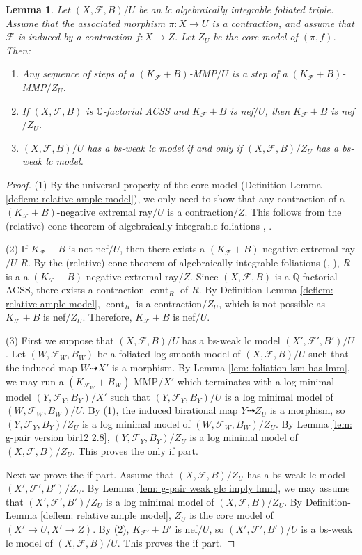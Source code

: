 \documentclass[11pt]{amsart}
\numberwithin{equation}{section}
\newcommand{\Qq}{\mathbb{Q}}
\newcommand{\cont}{\operatorname{cont}}
\newcommand{\Ff}{\mathcal{F}}
\newtheorem{lem}[thm]{Lemma}
\theoremstyle{definition}
\theoremstyle{definition}
\theoremstyle{definition}
\begin{document}
\begin{lem}\label{lem: minimal model foliation over zu}
    Let $(X,\Ff,B)/U$ be an lc algebraically integrable foliated triple. Assume that the associated morphism $\pi: X\rightarrow U$ is a contraction, and assume that $\Ff$ is induced by a contraction $f: X\rightarrow Z$. Let $Z_U$ be the core model of $(\pi,f)$. Then:
    \begin{enumerate}
        \item Any sequence of steps of a $(K_{\Ff}+B)$-MMP$/U$ is a step of a $(K_{\Ff}+B)$-MMP$/Z_U$.
        \item If $(X,\Ff,B)$ is $\Qq$-factorial ACSS and $K_{\Ff}+B$ is nef$/U$, then $K_{\Ff}+B$ is nef$/Z_U$.
        \item $(X,\Ff,B)/U$ has a bs-weak lc model if and only if $(X,\Ff,B)/Z_U$ has a bs-weak lc model.
    \end{enumerate}
\end{lem}
\begin{proof}
    (1) By the universal property of the core model (Definition-Lemma \ref{deflem: relative ample model}), we only need to show that any contraction of a $(K_{\Ff}+B)$-negative extremal ray$/U$ is a contraction$/Z$. This follows from the (relative) cone theorem of algebraically integrable foliations \cite[Theorem 3.9]{ACSS21}, \cite[Theorem 2.3.1]{CHLX23}.

    (2)  If $K_{\Ff}+B$ is not nef$/U$, then there exists a $(K_{\Ff}+B)$-negative extremal ray$/U$ $R$. By the (relative) cone theorem of algebraically integrable foliations (\cite[Theorem 3.9]{ACSS21}, \cite[Theorem 2.3.1]{CHLX23}), $R$ is a a $(K_{\Ff}+B)$-negative extremal ray$/Z$. Since $(X,\Ff,B)$ is a $\Qq$-factorial ACSS, there exists a contraction $\cont_R$ of $R$. By Definition-Lemma \ref{deflem: relative ample model}, $\cont_R$ is a contraction$/Z_U$, which is not possible as $K_{\Ff}+B$ is nef$/Z_U$. Therefore, $K_{\Ff}+B$ is nef$/U$.
    

    (3) First we suppose that $(X,\Ff,B)/U$ has a bs-weak lc model $(X',\Ff',B')/U$. Let $(W,\Ff_W,B_W)$ be a foliated log smooth model of $(X,\Ff,B)/U$ such that the induced map $W\dashrightarrow X'$ is a morphism. By Lemma \ref{lem: foliation lsm has lmm}, we may run a $(K_{\Ff_W}+B_W)$-MMP$/X'$ which terminates with a log minimal model $(Y,\Ff_Y,B_Y)/X'$ such that $(Y,\Ff_Y,B_Y)/U$ is a log minimal model of $(W,\Ff_W,B_W)/U$. By (1), the induced birational map $Y\dashrightarrow Z_U$ is a morphism, so $(Y,\Ff_Y,B_Y)/Z_U$ is a log minimal model of $(W,\Ff_W,B_W)/Z_U$. By Lemma \ref{lem: g-pair version bir12 2.8}, $(Y,\Ff_Y,B_Y)/Z_U$ is a log minimal model of $(X,\Ff,B)/Z_U$. This proves the only if part.

    Next we prove the if part. Assume that $(X,\Ff,B)/Z_U$ has a bs-weak lc model $(X',\Ff',B')/Z_U$. By Lemma \ref{lem: g-pair weak glc imply lmm}, we may assume that $(X',\Ff',B')/Z_U$ is a log minimal model of $(X,\Ff,B)/Z_U$. By Definition-Lemma \ref{deflem: relative ample model}, $Z_U$ is the core model of $(X'\rightarrow U,X'\rightarrow Z)$. By (2), $K_{\Ff'}+B'$ is nef$/U$, so $(X',\Ff',B')/U$ is a bs-weak lc model of $(X,\Ff,B)/U$. This proves the if part.
\end{proof}
\end{document}
